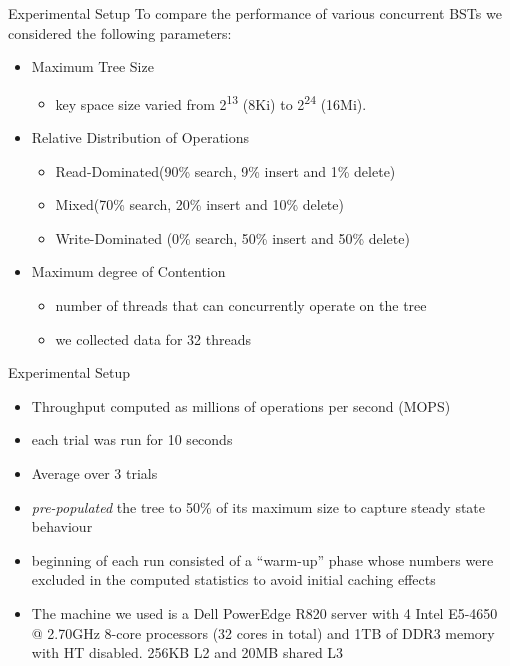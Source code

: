 \begin{frame}{Experimental Setup}
To compare the performance of various concurrent BSTs we considered the following parameters:
\begin{itemize}
\item Maximum Tree Size
  \begin{itemize}
  \item key space size varied from 2\textsuperscript{13} (8Ki) to 2\textsuperscript{24} (16Mi).
  \end{itemize}
\item Relative Distribution of Operations
  \begin{itemize}
  \item Read-Dominated\phantom{1}(90\% search, \phantom{1}9\% insert and \phantom{1}1\% delete)
  \item Mixed\phantom{1234567890}(70\% search, 20\% insert and 10\% delete)
  \item Write-Dominated (\phantom{1}0\% search, 50\% insert and 50\% delete)
  \end{itemize}
\item Maximum degree of Contention
  \begin{itemize}
  \item number of threads that can concurrently operate on the tree
  \item we collected data for 32 threads
  \end{itemize}
\end{itemize}
\end{frame}

\begin{frame}{Experimental Setup}
\small
{
\begin{itemize}
\item Throughput computed as millions of operations per second (MOPS)
\item each trial was run for 10 seconds
\item Average over 3 trials
\item \textit{pre-populated} the tree to 50\% of its maximum size to capture steady state behaviour
\item beginning of each run consisted of a ``warm-up'' phase whose numbers were excluded in the computed statistics to avoid initial caching effects
\item The machine we used is a Dell PowerEdge R820 server with 4 Intel E5-4650 @ 2.70GHz 8-core processors (32 cores in total) and 1TB of DDR3 memory with HT disabled. 256KB L2 and 20MB shared L3
\end{itemize}
}
\end{frame}

